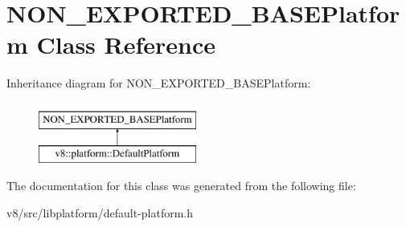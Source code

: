 \hypertarget{classNON__EXPORTED__BASEPlatform}{}\section{N\+O\+N\+\_\+\+E\+X\+P\+O\+R\+T\+E\+D\+\_\+\+B\+A\+S\+E\+Platform Class Reference}
\label{classNON__EXPORTED__BASEPlatform}
Inheritance diagram for N\+O\+N\+\_\+\+E\+X\+P\+O\+R\+T\+E\+D\+\_\+\+B\+A\+S\+E\+Platform\+:\begin{figure}[H]
\begin{center}
\leavevmode
\includegraphics[height=2.000000cm]{classNON__EXPORTED__BASEPlatform}
\end{center}
\end{figure}


The documentation for this class was generated from the following file\+:\begin{DoxyCompactItemize}
\item 
v8/src/libplatform/default-\/platform.\+h\end{DoxyCompactItemize}
